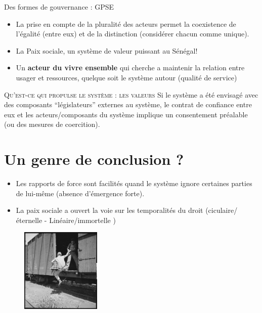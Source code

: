\documentclass[newPxFont]{beamer}
\begin{document}
\begin{frame}[c]{Des formes de gouvernance : GPSE}
\vspace{-1cm}
\begin{itemize}
    \item La prise en compte de la pluralité des acteurs permet la coexistence de l’égalité (entre eux) et de la distinction (considérer chacun comme unique).
    \item La Paix sociale, un système de valeur puissant au Sénégal!
    \item Un \textbf{acteur du vivre ensemble} qui cherche a maintenir la relation entre usager et ressources, quelque soit le système autour (qualité de service)
\end{itemize}
 \small{
   \begin{alertblock}{\textsc{Qu'est-ce qui propulse le système : les valeurs }}
    Si le système a été envisagé avec des composants “législateurs” externes au système, le contrat de confiance entre eux et les acteurs/composants du système implique un consentement préalable (ou des mesures de coercition).
   \end{alertblock}
 }
\end{frame}


\section{Un genre de conclusion ?}

\begin{frame}[c]{}
\vspace{-1cm}
\begin{itemize}
    \item Les rapports de force sont facilités quand le système ignore certaines parties de lui-même (absence d'émergence forte).
    \item La paix sociale a ouvert la voie sur les temporalités du droit (ciculaire/éternelle - Linéaire/immortelle )
\end{itemize}

\begin{figure}
  \includegraphics[height=4cm]{img/valeurs.jpg}
\end{figure}


\end{frame}
\end{document}
